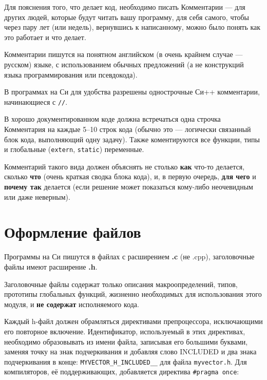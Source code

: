 Для пояснения того, что делает код, необходимо писать Комментарии ---
для других людей, которые будут читать вашу программу, для себя самого,
чтобы через пару лет (или недель), вернувшись к написанному, можно было
понять как это работает и что делает.

\zzstyleitem

Комментарии пишутся на понятном английском (в очень крайнем случае ---
русском) языке, с использованием обычных предложений (а не конструкций
языка программирования или псевдокода).

\zzstyleitem

В программах на Си для удобства разрешены однострочные Си++ комментарии,
начинающиеся с \texttt{//}.

\zzstyleitem

В хорошо документированном коде должна встречаться одна строчка
Комментария на каждые 5--10 строк кода (обычно это --- логически
связанный блок кода, выполняющий одну задачу). Также коментируются все
функции, типы и глобальные (\texttt{extern}, \texttt{static})
переменные.

\zzstyleitem

Комментарий такого вида должен объяснять не столько \textbf{как} что-то
делается, сколько \textbf{что} (очень краткая сводка блока кода), и, в первую очередь,
\textbf{для чего} и \textbf{почему так} делается (если решение может
показаться кому-либо неочевидным или даже неверным).


\section{Оформление файлов}


\zzstyleitem

Программы на Си пишутся в файлах с расширением \textbf{.c} (не .cpp),
заголовочные файлы имеют расширение \textbf{.h}.

\zzstyleitem

Заголовочные файлы содержат только описания макроопределений, типов,
прототипы глобальных функций, жизненно необходимых для использования
этого модуля, и \textbf{не содержат} исполняемого кода.

\zzstyleitem

Каждый h-файл должен обрамляться директивами препроцессора, исключающими
его повторное включение. Идентификатор, используемый в этих директивах,
необходимо образовывать из имени файла, записывая его большими буквами,
заменяя точку на знак подчеркивания и добавляя слово INCLUDED и два
знака подчеркивания в конце: \texttt{MYVECTOR\_H\_INCLUDED\_\_} для
файла \texttt{myvector.h}. Для компиляторов, её поддерживающих,
добавляется директива \texttt{\#pragma\ once}:

